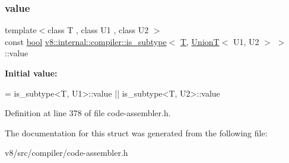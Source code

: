 \subsubsection{\texorpdfstring{value}{value}}
{\footnotesize\ttfamily template$<$class T , class U1 , class U2 $>$ \\
const \mbox{\hyperlink{classbool}{bool}} \mbox{\hyperlink{structv8_1_1internal_1_1compiler_1_1is__subtype}{v8\+::internal\+::compiler\+::is\+\_\+subtype}}$<$ \mbox{\hyperlink{classv8_1_1internal_1_1torque_1_1T}{T}}, \mbox{\hyperlink{structv8_1_1internal_1_1UnionT}{UnionT}}$<$ U1, U2 $>$ $>$\+::value\hspace{0.3cm}{\ttfamily [static]}}

{\bfseries Initial value\+:}
\begin{DoxyCode}
=
      is\_subtype<T, U1>::value || is\_subtype<T, U2>::value
\end{DoxyCode}


Definition at line 378 of file code-\/assembler.\+h.



The documentation for this struct was generated from the following file\+:\begin{DoxyCompactItemize}
\item 
v8/src/compiler/code-\/assembler.\+h\end{DoxyCompactItemize}
